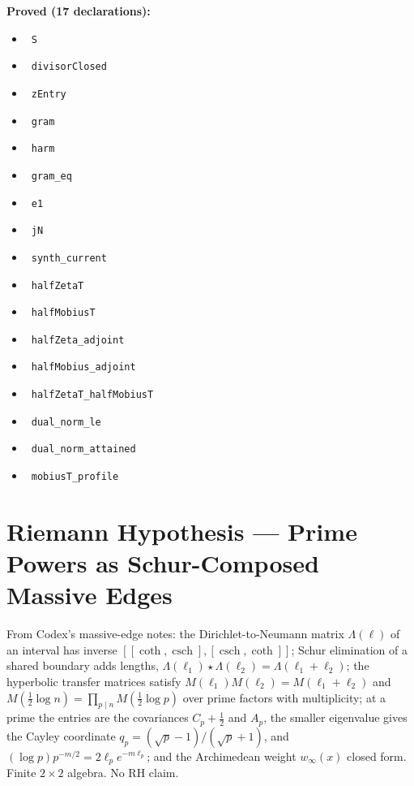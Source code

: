 \documentclass{report}
\theoremstyle{definition}
\begin{document}
\noindent\textbf{Proved (17 declarations):}
\begin{itemize}
  \item {}\leanok\ \texttt{S}
  \item {}\leanok\ \texttt{divisorClosed}
  \item {}\leanok\ \texttt{zEntry}
  \item {}\leanok\ \texttt{gram}
  \item {}\leanok\ \texttt{harm}
  \item {}\leanok\ \texttt{gram\_eq}
  \item {}\leanok\ \texttt{e1}
  \item {}\leanok\ \texttt{jN}
  \item {}\leanok\ \texttt{synth\_current}
  \item {}\leanok\ \texttt{halfZetaT}
  \item {}\leanok\ \texttt{halfMobiusT}
  \item {}\leanok\ \texttt{halfZeta\_adjoint}
  \item {}\leanok\ \texttt{halfMobius\_adjoint}
  \item {}\leanok\ \texttt{halfZetaT\_halfMobiusT}
  \item {}\leanok\ \texttt{dual\_norm\_le}
  \item {}\leanok\ \texttt{dual\_norm\_attained}
  \item {}\leanok\ \texttt{mobiusT\_profile}
\end{itemize}

\section{Riemann Hypothesis --- Prime Powers as Schur-Composed Massive Edges}
From Codex's massive-edge notes: the Dirichlet-to-Neumann matrix $\Lambda(\ell)$ of an interval has inverse $[[\coth,\operatorname{csch}],[\operatorname{csch},\coth]]$; Schur elimination of a shared boundary adds lengths, $\Lambda(\ell_1)\star\Lambda(\ell_2)=\Lambda(\ell_1+\ell_2)$; the hyperbolic transfer matrices satisfy $M(\ell_1)M(\ell_2)=M(\ell_1+\ell_2)$ and $M(\tfrac12\log n)=\prod_{p\mid n}M(\tfrac12\log p)$ over prime factors with multiplicity; at a prime the entries are the covariances $C_p+\tfrac12$ and $A_p$, the smaller eigenvalue gives the Cayley coordinate $q_p=(\sqrt p-1)/(\sqrt p+1)$, and $(\log p)p^{-m/2}=2\ell_pe^{-m\ell_p}$; and the Archimedean weight $w_\infty(x)$ closed form. Finite $2\times2$ algebra. No RH claim.
\end{document}
